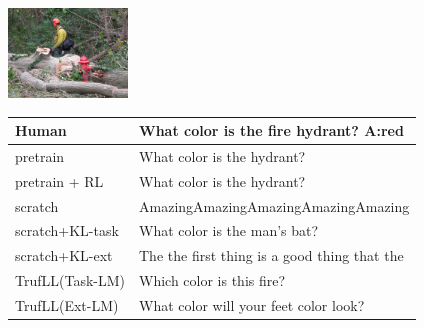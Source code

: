 \documentclass{article}
\newcommand{\algo}{TrufLL\xspace}
\begin{document}
\begin{table}[t!]
\begin{minipage}{0.2\linewidth}
		\centering
        \includegraphics[width=120px]{./COCO_val2014_000000148392.jpg}
	\end{minipage}
	\hspace{1.2cm}
	\begin{minipage}{0.85\linewidth}
	\small
		\scriptsize
		\begin{tabular}{ll}
			\toprule
			Human            & What color is the fire hydrant?  \quad \textbf{A:red} \\
			\midrule
			pretrain        &  What color is the hydrant? \\
		    pretrain + RL   & What color is the hydrant?  \\ \midrule
			scratch         & AmazingAmazingAmazingAmazingAmazing \\
			scratch+KL-task & What color is the man's bat? \\
			scratch+KL-ext  & The the first thing is a good thing that the \\ \midrule
			\algo(Task-LM)  & Which color is this fire? \\
			\algo(Ext-LM)   & What color will your feet color look? \\
			\bottomrule
		\end{tabular}
	\end{minipage}
	

\end{table}
\end{document}
